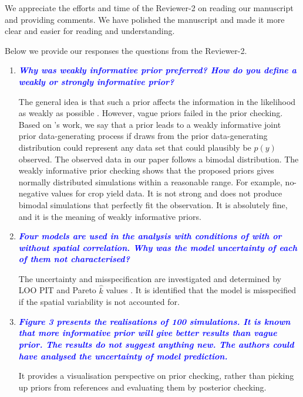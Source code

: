 \documentclass[a4paper]{article}   	%
\newcommand{\qtitle}[1]{\textit{\textbf{#1}}}
\begin{document}
We appreciate the efforts and time of the Reviewer-2 on reading our manuscript and providing comments. We have polished the manuscript and made it more clear and easier for reading and understanding. 

Below we provide our responses the questions from the Reviewer-2.

\begin{enumerate}
    \item \qtitle{\textcolor{blue}{Why was weakly informative prior preferred? How do you define a weakly or strongly informative prior?}}
    
    The general idea is that such a prior affects the information in the likelihood as weakly as possible \parencite{Gelman2017Prior}. However, vague priors failed in the prior checking. Based on \textcite{Gabry2019Visualization}'s work, we say that a prior leads to a weakly informative joint prior data-generating process if draws from the prior data-generating distribution could represent any data set that could plausibly be $p(y)$ observed. The observed data in our paper follows a bimodal distribution. The weakly informative prior checking shows that the proposed priors gives normally distributed simulations within a reasonable range. For example, no-negative values for crop yield data. It is not strong and does not produce bimodal simulations that perfectly fit the observation. It is absolutely fine, and it is the meaning of weakly informative priors. 
    
    \item \qtitle{\textcolor{blue}{Four models are used in the analysis with conditions of with or without spatial correlation. Why was the model uncertainty of each of them not characterised?}}
    
    The uncertainty and misspecification are investigated and determined by LOO PIT and Pareto $\hat{k}$ values \parencite{Gabry2019Visualization}. It is identified that the model is misspecified if the spatial variability is not accounted for. 

    \item \qtitle{\textcolor{blue}{Figure 3 presents the realisations of 100 simulations. It is known that more informative prior will give better results than vague prior. The results do not suggest anything new. The authors could have analysed the uncertainty of model prediction.}}
    
    It provides a visualisation perspective on prior checking, rather than picking up priors from references and evaluating them by posterior checking. 
    

\end{enumerate}
\end{document}
